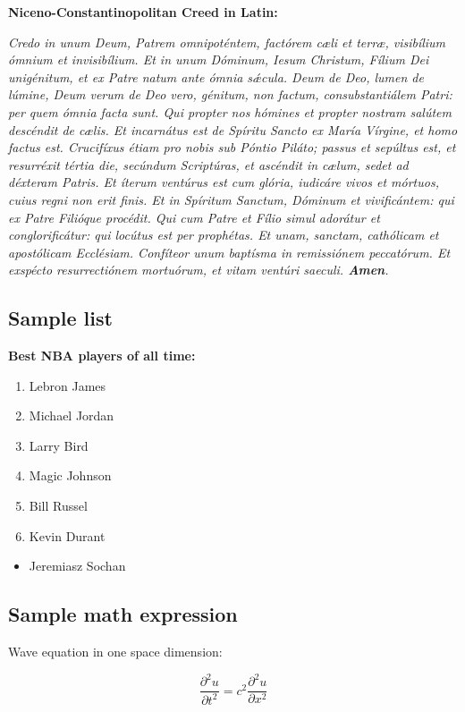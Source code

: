 \centerline{\textbf{Niceno-Constantinopolitan Creed in Latin:}}

\emph{Credo in unum Deum,
Patrem omnipoténtem,
factórem cæli et terræ,
visibílium ómnium et invisibílium.
Et in unum Dóminum, Iesum Christum,
Fílium Dei unigénitum,
et ex Patre natum ante ómnia sǽcula.
Deum de Deo, lumen de lúmine, Deum verum de Deo vero,
génitum, non factum, consubstantiálem Patri:
per quem ómnia facta sunt.
Qui propter nos hómines et propter nostram salútem
descéndit de cælis.
Et incarnátus est de Spíritu Sancto
ex María Vírgine, et homo factus est.
Crucifíxus étiam pro nobis sub Póntio Piláto;
passus et sepúltus est,
et resurréxit tértia die, secúndum Scriptúras,
et ascéndit in cælum, sedet ad déxteram Patris.
Et íterum ventúrus est cum glória,
iudicáre vivos et mórtuos,
cuius regni non erit finis.
Et in Spíritum Sanctum, Dóminum et vivificántem:
qui ex Patre Filióque procédit.
Qui cum Patre et Fílio simul adorátur et conglorificátur:
qui locútus est per prophétas.
Et unam, sanctam, cathólicam et apostólicam Ecclésiam.
Confíteor unum baptísma in remissiónem peccatórum.
Et exspécto resurrectiónem mortuórum,
et vitam ventúri saeculi. \textbf{Amen}.}

\subsection{Sample list}

\textbf{Best NBA players of all time:}

\begin{enumerate}
    \item Lebron James
    \item Michael Jordan
    \item Larry Bird
    \item Magic Johnson
    \item Bill Russel
    \item Kevin Durant
\end{enumerate}

\begin{itemize}
    \item Jeremiasz Sochan
\end{itemize}

\subsection{Sample math expression}

Wave equation in one space dimension:

\[\frac{\partial^2 u}{\partial t^2} = c^2 \frac{\partial^2 u}{\partial x^2}\]

